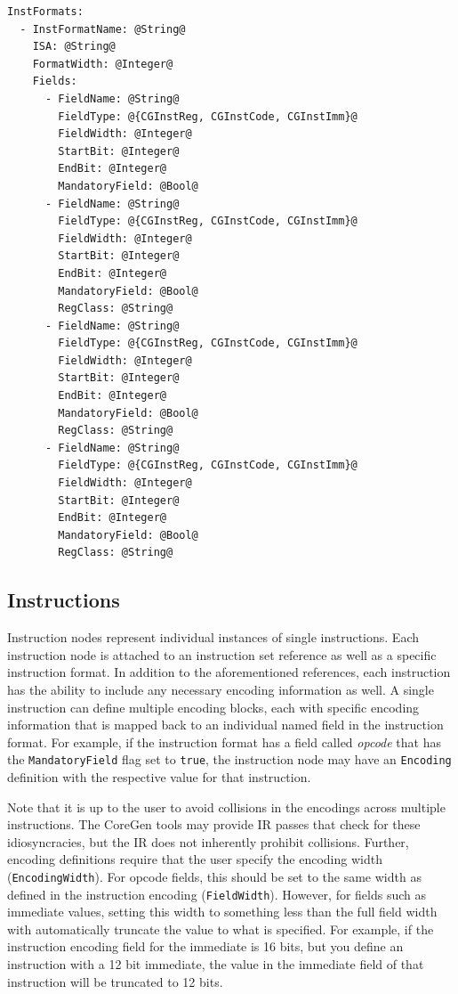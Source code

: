 \documentclass{article}
\begin{document}
\vspace{0.125in}
\begin{lstlisting}[frame=single,style=base,caption={Instruction Format Node Definition},captionpos=b,label={lis:instformat}]
InstFormats:
  - InstFormatName: @String@
    ISA: @String@
    FormatWidth: @Integer@
    Fields:
      - FieldName: @String@
        FieldType: @{CGInstReg, CGInstCode, CGInstImm}@
        FieldWidth: @Integer@
        StartBit: @Integer@
        EndBit: @Integer@
        MandatoryField: @Bool@
      - FieldName: @String@
        FieldType: @{CGInstReg, CGInstCode, CGInstImm}@
        FieldWidth: @Integer@
        StartBit: @Integer@
        EndBit: @Integer@
        MandatoryField: @Bool@
        RegClass: @String@
      - FieldName: @String@
        FieldType: @{CGInstReg, CGInstCode, CGInstImm}@
        FieldWidth: @Integer@
        StartBit: @Integer@
        EndBit: @Integer@
        MandatoryField: @Bool@
        RegClass: @String@
      - FieldName: @String@
        FieldType: @{CGInstReg, CGInstCode, CGInstImm}@
        FieldWidth: @Integer@
        StartBit: @Integer@
        EndBit: @Integer@
        MandatoryField: @Bool@
        RegClass: @String@
\end{lstlisting}

\clearpage
\subsection{Instructions}
\label{sec:InstructionNodes}

Instruction nodes represent individual instances of single instructions.  Each instruction 
node is attached to an instruction set reference as well as a specific instruction format.  In addition 
to the aforementioned references, each instruction has the ability to include any necessary encoding 
information as well.  A single instruction can define multiple encoding blocks, each with specific 
encoding information that is mapped back to an individual named field in the instruction format.  For example, 
if the instruction format has a field called \textit{opcode} that has the \texttt{MandatoryField} flag set to \texttt{true}, 
the instruction node may have an \texttt{Encoding} definition with the respective value for that instruction.  

Note that it is up to the user to avoid collisions in the encodings across multiple instructions.  The CoreGen tools 
may provide IR passes that check for these idiosyncracies, but the IR does not inherently prohibit collisions.  Further, 
encoding definitions require that the user specify the encoding width (\texttt{EncodingWidth}).  For opcode fields, this 
should be set to the same width as defined in the instruction encoding (\texttt{FieldWidth}).  However, for fields such 
as immediate values, setting this width to something less than the full field width with automatically truncate the value 
to what is specified.  For example, if the instruction encoding field for the immediate is 16 bits, but you define an instruction 
with a 12 bit immediate, the value in the immediate field of that instruction will be truncated to 12 bits.
\end{document}
